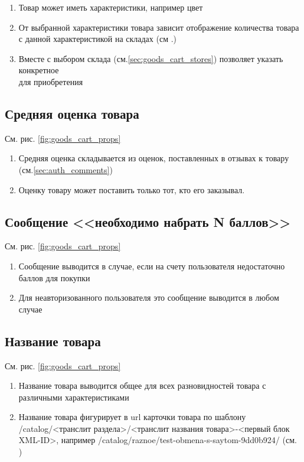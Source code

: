             \begin{enumerate}
                \item Товар может иметь характеристики, например цвет
                \item От выбранной характеристики товара зависит отображение 
                количества товара с данной характеристикой
                    на складах (см .\label{sec:goods_cart_store})
                \item Вместе с выбором склада 
                (см.\ref{sec:goods_cart_stores}) позволяет указать 
                конкретное \\
                    для приобретения
            \end{enumerate}
        
        \subsection{Средняя оценка товара}
            См. рис. \ref{fig:goods_cart_props}

            \begin{enumerate}
                \item Средняя оценка складывается из оценок, поставленных в 
                отзывах к товару (см.\ref{sec:auth_comments})
                \item Оценку товару может поставить только тот, кто его 
                заказывал.
            \end{enumerate}

        \subsection{Сообщение <<необходимо набрать N баллов>>}
            См. рис. \ref{fig:goods_cart_props}
            \begin{enumerate}
                \item Сообщение выводится в случае, если на счету 
                пользователя недостаточно баллов для покупки 
                \item Для неавторизованного пользователя это сообщение 
                выводится в любом случае
            \end{enumerate}

        \subsection{Название товара}
            См. рис. \ref{fig:goods_cart_props}
            \begin{enumerate}
                \item Название товара выводится общее для всех 
                разновидностей товара с различными характеристиками 
                \item Название товара фигурирует в url карточки товара по 
                шаблону /catalog/<транслит раздела>/<транслит
                    названия товара>-<первый блок XML-ID>, например 
                    /catalog/raznoe/test-obmena-s-saytom-9dd0b924/ (см.
                    )
            \end{enumerate}

